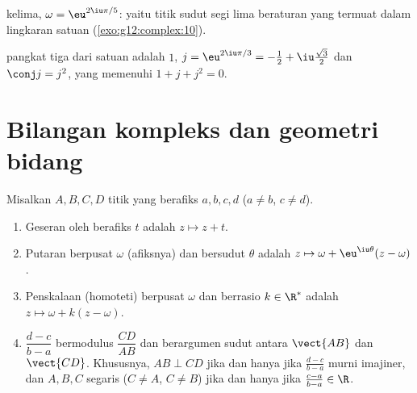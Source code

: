 \begin{omfigure}

{\small {} kelima, $\omega = \eu^{2\iu\pi/5}$: yaitu
titik sudut segi lima beraturan yang termuat dalam lingkaran satuan
(\cref{exo:g12:complex:10}).}
\end{omfigure}

\begin{example}
 pangkat tiga dari satuan adalah $1$, $j = \eu^{2\iu\pi/3} =
-\frac12 + \iu\frac{\sqrt3}{2}$ dan $\conj j = j^2$, yang memenuhi
$1 + j + j^2 = 0$.
\end{example}

\section{Bilangan kompleks dan geometri bidang}

\begin{proposition}\label{prop:g12:complex:geometry}
Misalkan $A, B, C, D$ titik yang berafiks $a, b, c, d$ ($a \neq b$,
$c \neq d$).
\begin{enumerate}
  \item Geseran oleh  berafiks $t$ adalah $z \mapsto z + t$.
  \item Putaran berpusat $\omega$ (afiksnya) dan bersudut $\theta$ adalah
        $z \mapsto \omega + \eu^{\iu\theta}(z - \omega)$.
  \item Penskalaan (homoteti) berpusat $\omega$ dan berrasio
        $k \in \R^*$ adalah $z \mapsto \omega + k(z - \omega)$.
  \item $\dfrac{d - c}{b - a}$ bermodulus $\dfrac{CD}{AB}$ dan berargumen
        sudut antara  $\vect{AB}$ dan $\vect{CD}$. Khususnya,
        $AB \perp CD$ jika dan hanya jika $\frac{d-c}{b-a}$ murni
        imajiner, dan $A, B, C$ segaris ($C \ne A$, $C\ne B$) jika dan
        hanya jika $\frac{c-a}{b-a} \in \R$.
\end{enumerate}
\end{proposition}

